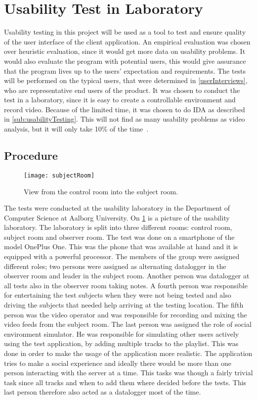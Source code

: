 \section{Usability Test in Laboratory}
Usability testing in this project will be used as a tool to test and
ensure quality of the user interface of the client application. An empirical evaluation was chosen over heuristic evaluation, since it would get more data on usability problems. It would also evaluate the program with potential users, this would give assurance that the program lives up to the users' expectation and requirements. The tests will be performed on the
typical users, that were determined in \cref{userInterviews}, who are
representative end users of the product. It was chosen to conduct the
test in a laboratory, since it is easy to create a controllable
environment and record video. Because of the limited time, it was
chosen to do IDA as described in \cref{sub:usabilityTesting}.  This will not find as many usability problems as video analysis, but it will only take 10\% of the time~\cite{kjeldskov2004instant}.

\subsection{Procedure}
\begin{figure}[hbtp]
  \centering
  \texttt{[image: subjectRoom]}
  \caption{View from the control room into the subject room.}\label{fig:subjectRoom}
\end{figure}

The tests were conducted at the usability laboratory in the Department of Computer Science at Aalborg University. On \cref{fig:subjectRoom} is a picture of the usability laboratory. The laboratory is split into three different rooms: control room, subject room and observer room. The test was done on a smartphone of the model OnePlus One. This was the phone that was available at hand and it is equipped with a powerful processor. The members of the group were assigned different roles; two persons were assigned as alternating datalogger in the observer room and leader in the subject room. Another person was datalogger at all tests also in the observer room taking notes. A fourth person was responsible for entertaining the test subjects when they were not being tested and also driving the subjects that needed help arriving at the testing location. The fifth person was the video operator and was responsible for recording and mixing the video feeds from the subject room. The last person was assigned the role of social environment simulator. He was responsible for simulating other users actively using the test application, by adding multiple tracks to the playlist. This was done in order to make the usage of the application more realistic. The application tries to make a social experience and ideally there would be more than one person interacting with the server at a time. This tasks was though a fairly trivial task since all tracks and when to add them where decided before the tests. This last person therefore also acted as a datalogger most of the time.

